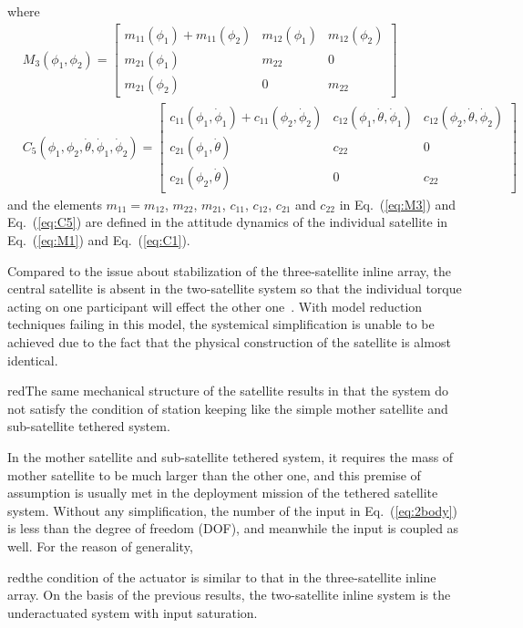 where
\begin{align}
&M_3(\phi_1,\phi_2)
=\begin{bmatrix}
m_{11}(\phi_1)+m_{11}(\phi_2) &m_{12}(\phi_1) &m_{12}(\phi_2)\\
m_{21}(\phi_1) &m_{22} &0\\
m_{21}(\phi_2) &0      &m_{22}
\end{bmatrix}\label{eq:M3}\\
&C_5(\phi_1,\phi_2,\dot{\theta},\dot{\phi}_1,\dot{\phi}_2)
=\begin{bmatrix}
c_{11}(\phi_1,\dot{\phi}_1)+c_{11}(\phi_2,\dot{\phi}_2) &c_{12}(\phi_1,\dot{\theta},\dot{\phi}_1) &c_{12}(\phi_2,\dot{\theta},\dot{\phi}_2)\\
c_{21}(\phi_1,\dot{\theta}) &c_{22} &0\\
c_{21}(\phi_2,\dot{\theta}) &0 &c_{22}
\end{bmatrix}\label{eq:C5}
\end{align}
and the elements $m_{11}=m_{12}$, $m_{22}$, $m_{21}$, $c_{11}$, $c_{12}$, $c_{21}$ and $c_{22}$ in Eq.~(\ref{eq:M3}) and Eq.~(\ref{eq:C5}) are defined in the attitude dynamics of the individual satellite in Eq.~(\ref{eq:M1}) and Eq.~(\ref{eq:C1}).\par
Compared to the issue about stabilization of the three-satellite inline array, the central satellite is absent in the two-satellite system so that the individual torque acting on one participant will effect the other one~\cite{chung2007nonlinear}. With model reduction techniques failing in this model, the systemical simplification is unable to be achieved due to the fact that the physical construction of the satellite is almost identical. \begin{color}{red}The same mechanical structure of the satellite results in that the system do not satisfy the condition of station keeping like the simple mother satellite and sub-satellite tethered system.\end{color} In the mother satellite and sub-satellite tethered system, it requires the mass of mother satellite to be much larger than the other one, and this premise of assumption is usually met in the deployment mission of the tethered satellite system. Without any simplification, the number of the input in Eq.~(\ref{eq:2body}) is less than the degree of freedom (DOF), and meanwhile the input is coupled as well. For the reason of generality, \begin{color}{red}the condition of the actuator is similar to that in the three-satellite inline array. On the basis of the previous results, the two-satellite inline system is the underactuated system with input saturation.\end{color}\par
